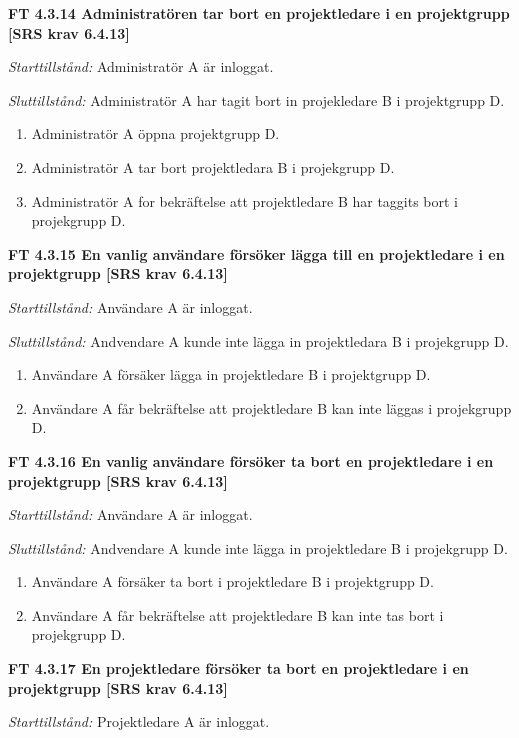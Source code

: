 \documentclass[a4paper]{article}
\begin{document}
\textbf{FT 4.3.14 Administratören tar bort en projektledare i en projektgrupp [SRS krav 6.4.13]}

\emph{Starttillstånd:} Administratör A är inloggat.

\emph{Sluttillstånd:} Administratör A har tagit bort  in projekledare B i projektgrupp D.

\begin{enumerate}
\item Administratör A öppna projektgrupp D.
\item Administratör A tar bort  projektledara B i projekgrupp D.
\item Administratör A for bekräftelse att projektledare B har taggits  bort i projekgrupp D.
\end{enumerate}

\textbf{FT 4.3.15 En vanlig användare försöker lägga till en projektledare i en projektgrupp [SRS krav 6.4.13]} 

\emph{Starttillstånd:}  Användare A är inloggat.

\emph{Sluttillstånd:} Andvendare A kunde inte lägga in projektledara B i projekgrupp D.

\begin{enumerate}
\item Användare  A
försäker lägga in projektledare B i  projektgrupp D.
\item Användare A får bekräftelse att projektledare B kan inte läggas i   projekgrupp D.
\end{enumerate}

\textbf{FT 4.3.16 En vanlig användare försöker ta bort en projektledare i en projektgrupp [SRS krav 6.4.13]}

\emph{Starttillstånd:} Användare A är inloggat.

\emph{Sluttillstånd:} Andvendare A kunde inte lägga in projektledare B i projekgrupp D.

\begin{enumerate}
\item Användare A försäker ta bort  i projektledare B  i  projektgrupp D.
\item Användare A får bekräftelse att projektledare B kan inte tas bort  i   projekgrupp D.
\end{enumerate}

\textbf{FT 4.3.17 En projektledare försöker ta bort en projektledare i en projektgrupp [SRS krav 6.4.13]}

\emph{Starttillstånd:} Projektledare A är inloggat.
\end{document}
